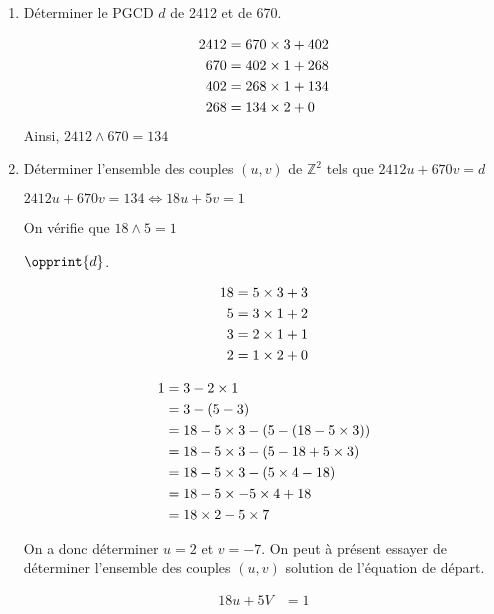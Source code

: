 \documentclass[a4paper,10pt]{article}
\newcommand{\Z}{\mathbb{Z}}
\begin{document}
\begin{enumerate}

\item
Déterminer le PGCD $d$ de 2412 et de 670.

\begin{align}
	2412 &= 670 \times 3 + 402 \notag \\
	670 &=  402 \times 1 + 268 \notag \\
	402 &= 268 \times 1 + 134 \notag \\
	268 &= 134 \times 2 + 0 \notag
\end{align}
Ainsi, $2412 \wedge 670 = 134$

\item
Déterminer l'ensemble des couples $(u, v)$ de $\Z^2$ tels que $2412u + 670v=d$

$2412u + 670v=134 \Longleftrightarrow18u+5v=1$

On vérifie que $18 \wedge 5=1$
\begin{center}
	$\opprint{d}$.
\end{center}

\begin{align}
	18 &= 5 \times 3 + 3 \notag \\
	5 &= 3 \times 1 + 2 \notag \\
	3 &= 2 \times 1 + 1 \notag \\
	2 &= 1 \times 2 + 0 \notag
\end{align}

\begin{align}
	1 &= 3-2 \times 1 \notag \\
		&= 3-(5-3) \notag \\
		&= 18-5 \times 3 -(5-(18-5 \times 3)) \notag \\
		&=18-5\times 3-(5-18+5\times 3) \notag \\
		&=18 - 5 \times 3 -(5 \times 4 - 18) \notag \\
		&= 18-5 \times -5 \times 4 + 18 \notag \\
		&= 18 \times 2 - 5 \times 7 \notag
\end{align}

On a donc déterminer $u=2$ et $v=-7$. On peut à présent essayer de déterminer l'ensemble des couples $(u,v)$ solution de l'équation de départ.

\begin{align}
	18u + 5V &=1 \\	
\end{align}
\end{enumerate}



 
\end{document}
